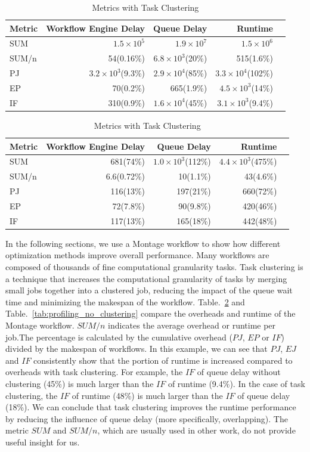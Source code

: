 \begin{table}[htb]
	\footnotesize
	\centering
	\begin{tabular}{l|rrrr}
Metric & Workflow Engine Delay  &Queue Delay& Runtime\\
		\hline
		SUM & $1.5\times 10^5$ & $1.9\times 10^7$ &  $1.5\times 10^6$ \\
		SUM/n & 54(0.16\%) & $6.8\times 10^3$(20\%)& 515(1.6\%) \\
		PJ & $3.2\times 10^3$(9.3\%) & $2.9\times 10^4$(85\%) & $3.3\times 10^4$(102\%) \\
		EP & 70(0.2\%) & 665(1.9\%) & $4.5\times 10^3$(14\%) \\
		IF & 310(0.9\%)& $1.6\times 10^4$(45\%) & $3.1\times 10^3$(9.4\%)\\
	\end{tabular}
		\caption{Metrics Without Task Clustering}
		\label{tab:profiling_no_clustering}
	\quad
	\begin{tabular}{l|rrrr}
Metric & Workflow Engine Delay  &Queue Delay& Runtime\\
		\hline
		SUM & 681(74\%) & $1.0\times 10^3$(112\%) &  $4.4\times 10^3$(475\%) \\
		SUM/n & 6.6(0.72\%) & 10(1.1\%)& 43(4.6\%) \\
		PJ & 116(13\%) & 197(21\%) & 660(72\%) \\
		EP & 72(7.8\%) & 90(9.8\%) & 420(46\%) \\
		IF & 117(13\%)& 165(18\%) & 442(48\%)\\
	\end{tabular}
		\caption{Metrics with Task Clustering}
	\label{tab:profiling_clustering}
\end{table}

In the following sections, we use a Montage workflow to show how different optimization methods improve overall performance. Many workflows are composed of thousands of fine computational granularity tasks. Task clustering is a technique that increases the computational granularity of tasks by merging small jobs together into a clustered job, reducing the impact of the queue wait time and minimizing the makespan of the workflow. Table.~\ref{tab:profiling_clustering} and Table.~\ref{tab:profiling_no_clustering} compare the overheads and runtime of the Montage workflow. $SUM/n$ indicates the average overhead or runtime per job.The percentage is calculated by the cumulative overhead ($PJ$, $EP$ or $IF$) divided by the makespan of workflows. 
In this example, we can see that $PJ$, $EJ$ and $IF$ consistently show that the portion of runtime is increased compared to overheads with task clustering. For example, the $IF$ of queue delay without clustering (45\%) is much larger than the $IF$ of runtime (9.4\%). In the case of task clustering, the $IF$ of runtime (48\%) is much larger than the $IF$ of queue delay (18\%). We can conclude that task clustering improves the runtime performance by reducing the influence of queue delay (more specifically, overlapping). The metric $SUM$ and $SUM/n$, which are usually used in other work, do not provide useful insight for us. 


